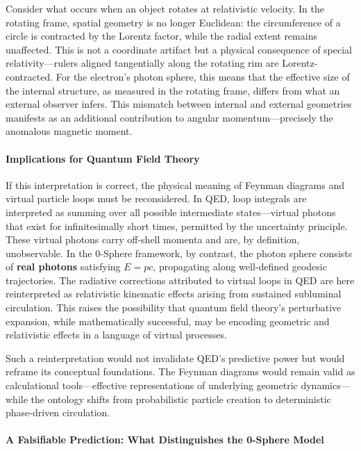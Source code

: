 \documentclass[12pt,letterpaper]{article}
\begin{document}
Consider what occurs when an object rotates at relativistic velocity. In the rotating frame, spatial geometry is no longer Euclidean: the circumference of a circle is contracted by the Lorentz factor, while the radial extent remains unaffected. This is not a coordinate artifact but a physical consequence of special relativity---rulers aligned tangentially along the rotating rim are Lorentz-contracted. For the electron's photon sphere, this means that the effective size of the internal structure, as measured in the rotating frame, differs from what an external observer infers. This mismatch between internal and external geometries manifests as an additional contribution to angular momentum---precisely the anomalous magnetic moment.

\paragraph{Implications for Quantum Field Theory}

If this interpretation is correct, the physical meaning of Feynman diagrams and virtual particle loops must be reconsidered. In QED, loop integrals are interpreted as summing over all possible intermediate states---virtual photons that exist for infinitesimally short times, permitted by the uncertainty principle. These virtual photons carry off-shell momenta and are, by definition, unobservable. In the 0-Sphere framework, by contrast, the photon sphere consists of \textbf{real photons} satisfying $E = pc$, propagating along well-defined geodesic trajectories. The radiative corrections attributed to virtual loops in QED are here reinterpreted as relativistic kinematic effects arising from sustained subluminal circulation. This raises the possibility that quantum field theory's perturbative expansion, while mathematically successful, may be encoding geometric and relativistic effects in a language of virtual processes.

Such a reinterpretation would not invalidate QED's predictive power but would reframe its conceptual foundations. The Feynman diagrams would remain valid as calculational tools---effective representations of underlying geometric dynamics---while the ontology shifts from probabilistic particle creation to deterministic phase-driven circulation.

\paragraph{A Falsifiable Prediction: What Distinguishes the 0-Sphere Model}
\end{document}
